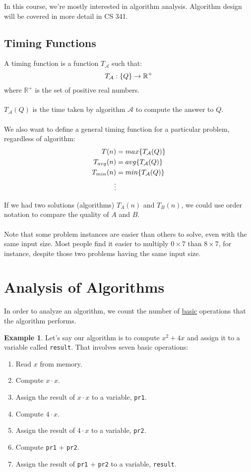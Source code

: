 \documentclass[]{article}
\theoremstyle{definition}
\newtheorem{ex}{Example}[section]
\DeclarePairedDelimiter{\set}{\lbrace}{\rbrace}
\begin{document}
		In this course, we're mostly interested in algorithm analysis. Algorithm design will be covered in more detail in CS 341.

		\subsection{Timing Functions}
			A timing function is a function $T_{\mathcal{A}}$ such that:
			\begin{align*}
				T_{\mathcal{A}}: \set{Q } \to \mathbb{R}^{+}
			\end{align*}
			where $\mathbb{R}^{+}$ is the set of positive real numbers.
			\\ \\
			$T_{\mathcal{A}}(Q)$ is the time taken by algorithm $\mathcal{A}$ to compute the answer to $Q$.
			\\ \\
			We also want to define a general timing function for a particular problem, regardless of algorithm: 
			\begin{align*}
				T(n) &= max \set{T_{ \mathcal{A}}(Q) } \\ 
				T_{avg}(n) &= avg \set{T_{\mathcal{A}}(Q) } \\ 
				T_{min}(n) &= min \set{T_{\mathcal{A}}(Q) } \\
				\vdots&
			\end{align*}

			If we had two solutions (algorithms) $T_A(n)$ and $T_B(n)$, we could use order notation to compare the quality of $A$ and $B$.
			\\ \\
			Note that some problem instances are easier than others to solve, even with the same input size. Most people find it easier to multiply $0 \times 7$ than $8 \times 7$, for instance, despite those two problems having the same input size.
	\section{Analysis of Algorithms}
		In order to analyze an algorithm, we count the number of \underline{basic} operations that the algorithm performs.
		\begin{ex}
			Let's say our algorithm is to compute $x^2 + 4x$ and assign it to a variable called \verb+result+. That involves seven basic operations:
			\begin{enumerate}
				\item Read $x$ from memory.
				\item Compute $x \cdot x$.
				\item Assign the result of $x \cdot x$ to a variable, \verb+pr1+.
				\item Compute $4 \cdot x$.
				\item Assign the result of $4 \cdot x$ to a variable, \verb+pr2+.
				\item Compute \verb+pr1+ + \verb+pr2+.
				\item Assign the result of \verb+pr1+ + \verb+pr2+ to a variable, \verb+result+.
			\end{enumerate}
		\end{ex}
\end{document}

